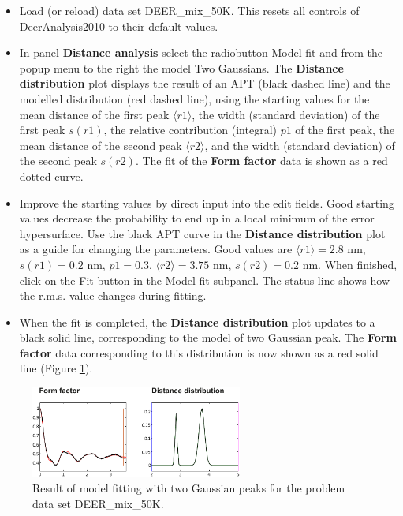 \documentclass[11pt,a4paper]{article}
\begin{document}
\begin{itemize}
	\item Load (or reload) data set {\ttfamily DEER\_mix\_50K}. This resets all controls of {\ttfamily DeerAnalysis2010} to their default values.
	\item In panel {\ttfamily \bf Distance analysis} select the radiobutton {\ttfamily Model fit} and from the popup menu to the right the model {\ttfamily Two Gaussians}. The {\ttfamily \bf Distance distribution} plot displays the result of an APT (black dashed line) and the modelled distribution (red dashed line), using the starting values for the mean distance of the first peak $\langle r1 \rangle$, the width (standard deviation) of the first peak $s(r1)$, the relative contribution (integral) $p1$ of the first peak, the mean distance of the second peak $\langle r2 \rangle$, and the width (standard deviation) of the second peak $s(r2)$. The fit of the {\ttfamily \bf Form factor} data is shown as a red dotted curve.
	\item Improve the starting values by direct input into the edit fields. Good starting values decrease the probability to end up in a local minimum of the error hypersurface. Use the black APT curve in the {\ttfamily \bf Distance distribution} plot as a guide for changing the parameters. Good values are $\langle r1 \rangle = 2.8$ nm, $s(r1) = 0.2$ nm, $p1 = 0.3$, $\langle r2 \rangle = 3.75$ nm, $s(r2) = 0.2$ nm. When finished, click on the {\ttfamily Fit} button in the {\ttfamily Model fit} subpanel. The status line shows how the r.m.s. value changes during fitting.
	 \item When the fit is completed, the {\ttfamily \bf Distance distribution} plot updates to a black solid line, corresponding to the model of two Gaussian peak. The {\ttfamily \bf Form factor} data corresponding to this distribution is now shown as a red solid line (Figure \ref{fig:7}).
\end{itemize}

\begin{figure}[ht]
 \vspace{10mm}
 	\begin{center}
		\includegraphics[width=0.62\textwidth]{figure7.pdf}
	\end{center}
	\caption{Result of model fitting with two Gaussian peaks for the problem data set {\ttfamily DEER\_mix\_50K}. }
	\label{fig:7}
\end{figure}
\end{document}
